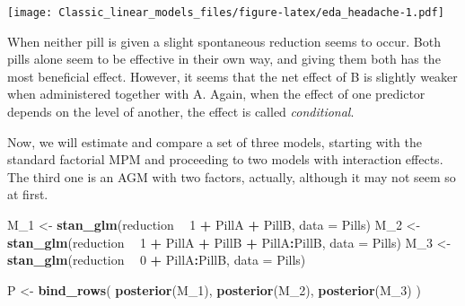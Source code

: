 \documentclass[]{svmono}
\newenvironment{Shaded}{\begin{snugshade}}{\end{snugshade}}
\newcommand{\KeywordTok}[1]{\textcolor[rgb]{0.13,0.29,0.53}{\textbf{#1}}}
\newcommand{\DataTypeTok}[1]{\textcolor[rgb]{0.13,0.29,0.53}{#1}}
\newcommand{\DecValTok}[1]{\textcolor[rgb]{0.00,0.00,0.81}{#1}}
\newcommand{\StringTok}[1]{\textcolor[rgb]{0.31,0.60,0.02}{#1}}
\newcommand{\OperatorTok}[1]{\textcolor[rgb]{0.81,0.36,0.00}{\textbf{#1}}}
\newcommand{\NormalTok}[1]{#1}
\theoremstyle{definition}
\theoremstyle{definition}
\theoremstyle{definition}
\theoremstyle{remark}
\begin{document}
\begin{Shaded}
\end{Shaded}

\texttt{[image: Classic\_linear\_models\_files/figure-latex/eda\_headache-1.pdf]}

When neither pill is given a slight spontaneous reduction seems to
occur. Both pills alone seem to be effective in their own way, and
giving them both has the most beneficial effect. However, it seems that
the net effect of B is slightly weaker when administered together with
A. Again, when the effect of one predictor depends on the level of
another, the effect is called \emph{conditional}.

Now, we will estimate and compare a set of three models, starting with
the standard factorial MPM and proceeding to two models with interaction
effects. The third one is an AGM with two factors, actually, although it
may not seem so at first.

\begin{Shaded}
\begin{Highlighting}[]
\NormalTok{M_}\DecValTok{1}\NormalTok{ <-}\StringTok{ }\KeywordTok{stan_glm}\NormalTok{(reduction }\OperatorTok{~}\StringTok{ }\DecValTok{1} \OperatorTok{+}\StringTok{ }\NormalTok{PillA }\OperatorTok{+}\StringTok{ }\NormalTok{PillB, }\DataTypeTok{data =}\NormalTok{ Pills)}
\NormalTok{M_}\DecValTok{2}\NormalTok{ <-}\StringTok{ }\KeywordTok{stan_glm}\NormalTok{(reduction }\OperatorTok{~}\StringTok{ }\DecValTok{1} \OperatorTok{+}\StringTok{ }\NormalTok{PillA }\OperatorTok{+}\StringTok{ }\NormalTok{PillB }\OperatorTok{+}\StringTok{ }\NormalTok{PillA}\OperatorTok{:}\NormalTok{PillB, }\DataTypeTok{data =}\NormalTok{ Pills)}
\NormalTok{M_}\DecValTok{3}\NormalTok{ <-}\StringTok{ }\KeywordTok{stan_glm}\NormalTok{(reduction }\OperatorTok{~}\StringTok{ }\DecValTok{0} \OperatorTok{+}\StringTok{ }\NormalTok{PillA}\OperatorTok{:}\NormalTok{PillB, }\DataTypeTok{data =}\NormalTok{ Pills)}

\NormalTok{P <-}\StringTok{ }\KeywordTok{bind_rows}\NormalTok{(}
  \KeywordTok{posterior}\NormalTok{(M_}\DecValTok{1}\NormalTok{),}
  \KeywordTok{posterior}\NormalTok{(M_}\DecValTok{2}\NormalTok{),}
  \KeywordTok{posterior}\NormalTok{(M_}\DecValTok{3}\NormalTok{)}
\NormalTok{)}
\end{Highlighting}
\end{Shaded}
\end{document}
